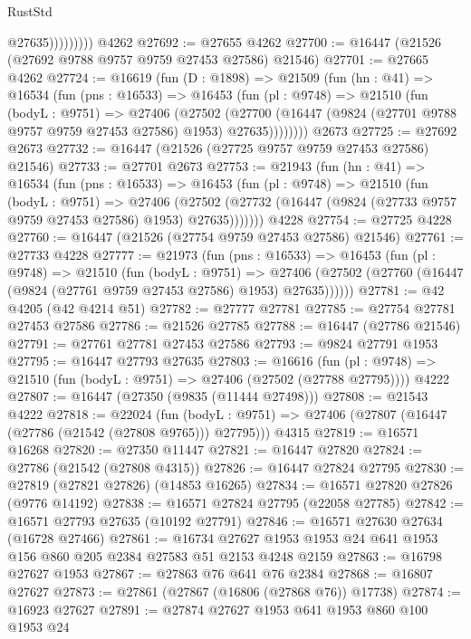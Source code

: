 \begin{lexlean}{RustStd}
\begin{coremodule}
                      @27635)))))))))
    @4262
@27692 := @27655 @4262
@27700 := @16447 (@21526 (@27692 @9788 @9757 @9759 @27453 @27586) @21546)
@27701 := @27665 @4262
@27724 := @16619
    (fun (D : @1898) =>
    @21509
      (fun (hn : @41) =>
      @16534
        (fun (pns : @16533) =>
        @16453
          (fun (pl : @9748) =>
          @21510
            (fun (bodyL : @9751) =>
            @27406
              (@27502
                (@27700
                  (@16447 (@9824 (@27701 @9788 @9757 @9759 @27453 @27586) @1953) @27635))))))))
    @2673
@27725 := @27692 @2673
@27732 := @16447 (@21526 (@27725 @9757 @9759 @27453 @27586) @21546)
@27733 := @27701 @2673
@27753 := @21943
    (fun (hn : @41) =>
    @16534
      (fun (pns : @16533) =>
      @16453
        (fun (pl : @9748) =>
        @21510
          (fun (bodyL : @9751) =>
          @27406
            (@27502 (@27732 (@16447 (@9824 (@27733 @9757 @9759 @27453 @27586) @1953) @27635)))))))
    @4228
@27754 := @27725 @4228
@27760 := @16447 (@21526 (@27754 @9759 @27453 @27586) @21546)
@27761 := @27733 @4228
@27777 := @21973
    (fun (pns : @16533) =>
    @16453
      (fun (pl : @9748) =>
      @21510
        (fun (bodyL : @9751) =>
        @27406 (@27502 (@27760 (@16447 (@9824 (@27761 @9759 @27453 @27586) @1953) @27635))))))
@27781 := @42 @4205 (@42 @4214 @51)
@27782 := @27777 @27781
@27785 := @27754 @27781 @27453 @27586
@27786 := @21526 @27785
@27788 := @16447 (@27786 @21546)
@27791 := @27761 @27781 @27453 @27586
@27793 := @9824 @27791 @1953
@27795 := @16447 @27793 @27635
@27803 := @16616
    (fun (pl : @9748) => @21510 (fun (bodyL : @9751) => @27406 (@27502 (@27788 @27795))))
    @4222
@27807 := @16447 (@27350 (@9835 (@11444 @27498)))
@27808 := @21543 @4222
@27818 := @22024
    (fun (bodyL : @9751) => @27406 (@27807 (@16447 (@27786 (@21542 (@27808 @9765))) @27795)))
    @4315
@27819 := @16571 @16268
@27820 := @27350 @11447
@27821 := @16447 @27820
@27824 := @27786 (@21542 (@27808 @4315))
@27826 := @16447 @27824 @27795
@27830 := @27819 (@27821 @27826) (@14853 @16265)
@27834 := @16571 @27820 @27826 (@9776 @14192)
@27838 := @16571 @27824 @27795 (@22058 @27785)
@27842 := @16571 @27793 @27635 (@10192 @27791)
@27846 := @16571 @27630 @27634 (@16728 @27466)
@27861 := @16734 @27627 @1953 @1953 @24 @641 @1953 @156 @860 @205 @2384 @27583 @51 @2153 @4248 @2159
@27863 := @16798 @27627 @1953
@27867 := @27863 @76 @641 @76 @2384
@27868 := @16807 @27627
@27873 := @27861 (@27867 (@16806 (@27868 @76)) @17738)
@27874 := @16923 @27627
@27891 := @27874
    @27627
    @1953
    @641
    @1953
    @860
    @100
    @1953
    @24

\end{coremodule}
\end{lexlean}
